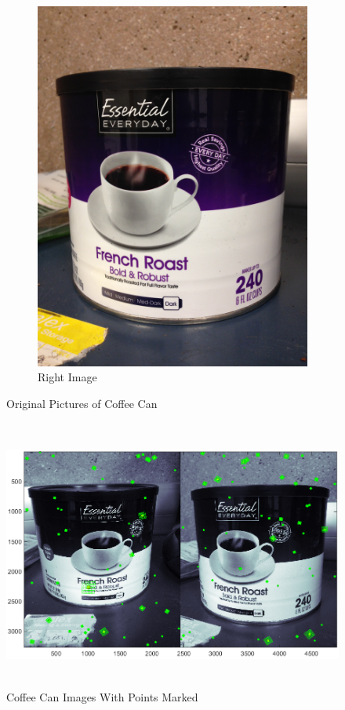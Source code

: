 \documentclass[11pt,psfig]{article}
\begin{document}
\begin{figure}
\begin{subfigure}[b]{0.4\textwidth}
                \includegraphics[width=\textwidth]{coffeeCan2.jpg}
                \caption{Right Image}
        \end{subfigure}
        \caption{Original Pictures of Coffee Can}
        \label{cc1}
\end{figure}

\begin{figure}[H]
\centering
\includegraphics[height=3.5in]{coffeeCan_pointsWoMatching.png}
\caption{Coffee Can Images With Points Marked}
\label{cc2}
\end{figure}
\end{document}

